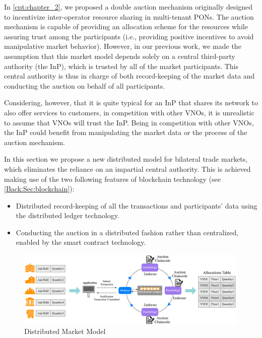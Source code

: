 In \autoref{cpt:chapter_2}, we proposed a double auction mechanism  originally designed to incentivize inter-operator resource sharing in multi-tenant \acp{PON}. The auction mechanism is capable of providing an allocation scheme for the resources while assuring trust among the participants (i.e., providing positive incentives to avoid manipulative market behavior). However, in our previous work, we made the assumption that this market model depends solely on a central third-party authority (the \ac{InP}), which is trusted by all of the market participants. This central authority is thus in charge of both record-keeping of the market data and conducting the auction on behalf of all participants.

Considering, however, that it is quite typical for an \ac{InP} that shares its network to also offer services to customers, in competition with other \acp{VNO}, it is unrealistic to assume that \acp{VNO} will trust the \ac{InP}. Being in competition with other \acp{VNO}, the \ac{InP} could benefit from manipulating the market data or the process of the auction mechanism. 

In this section we propose a new distributed model for bilateral trade markets, which eliminates the reliance on an impartial central authority. This is achieved making use of the two following features of blockchain technology (see \autoref{Back:Sec:blockchain}):

\begin{itemize}
    \item Distributed record-keeping of all the transactions and participants' data using the distributed ledger technology.
    \item Conducting the auction in a distributed fashion rather than centralized, enabled by the smart contract technology.
\end{itemize}

\begin{figure}
    \centering
    \includegraphics[width=0.99\textwidth]{Figures/figil.eps}
    \caption{Distributed Market Model}
    \label{fig:bc:model}
\end{figure}


